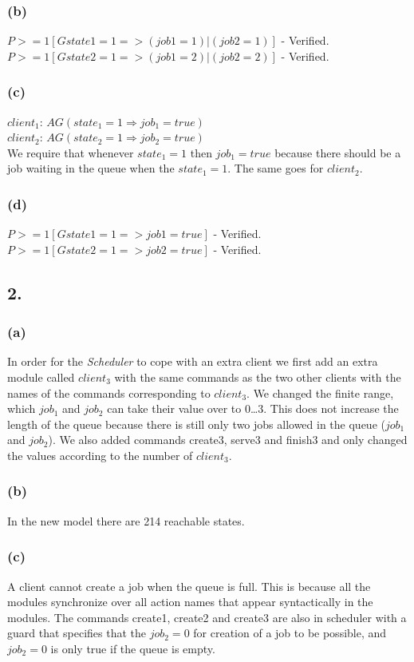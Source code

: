 \documentclass[12pt]{report}
\begin{document}
\subsubsection*{(b)}
$P>=1 [G state1=1=>(job1=1)|(job2=1)]$ - Verified.\\
$P>=1 [G state2=1=>(job1=2)|(job2=2)]$ - Verified.
\subsubsection*{(c)}
$client_1$: $AG (state_1 = 1 \Rightarrow job_1 = true)$\\
$client_2$: $AG (state_2 = 1 \Rightarrow job_2 = true)$\\
We require that whenever $state_1 = 1$ then $job_1 = true$ because there should be a job waiting in the queue when the $state_1 = 1$. The same goes for $client_2$.
\subsubsection*{(d)}
$P>=1 [G state1=1=>job1=true]$ - Verified.\\
$P>=1 [G state2=1=>job2=true]$ - Verified.
\subsection*{2.}
\subsubsection*{(a)}
In order for the \emph{Scheduler} to cope with an extra client we first add an extra module called $client_3$ with the same commands as the two other clients with the names of the commands corresponding to $client_3$. We changed the finite range, which $job_1$ and $job_2$ can take their value over to 0\dots3. This does not increase the length of the queue because there is still only two jobs allowed in the queue ($job_1$ and $job_2$). We also added commands create3, serve3 and finish3 and only changed the values according to the number of $client_3$.
\subsubsection*{(b)}
In the new model there are 214 reachable states.
\subsubsection*{(c)}
A client cannot create a job when the queue is full. This is because all the modules synchronize over all action names that appear syntactically in the modules. The commands create1, create2 and create3 are also in scheduler with a guard that specifies that the $job_2 = 0$ for creation of a job to be possible, and $job_2 = 0$ is only true if the queue is empty.
\end{document}
